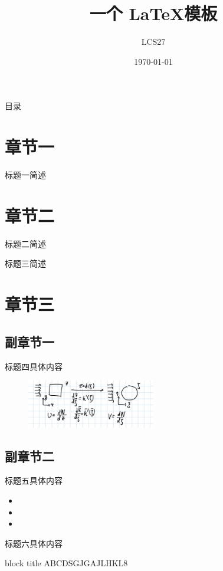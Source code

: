 \documentclass[aspectratio=169]{beamer}
\title{一个 \LaTeX 模板}
\author{LCS27}
\institute{My dear institute}
\date{\today}
\begin{document}
\maketitle
\begin{frame}{目录}
\tableofcontents
\end{frame}
\section{章节一}
\begin{frame}{标题一}{简述}
\zhlipsum[10]
\end{frame}

\section{章节二}
\begin{frame}[allowframebreaks]{标题二}{简述}
\zhlipsum[11]
\end{frame}
\begin{frame}[allowframebreaks]{标题三}{简述}
\zhlipsum[12]
\end{frame}

\section{章节三}
\subsection{副章节一}
\begin{frame}[allowframebreaks]{标题四}{具体内容}
\zhlipsum[1]
\begin{figure}
    \centering
    \includegraphics[width=0.5\textwidth]{../picture/1.jpg}
\end{figure}
\end{frame}
\subsection{副章节二}
\begin{frame}[allowframebreaks]{标题五}{具体内容}
\zhlipsum[2]
\begin{itemize}
    \item \zhlipsum[3]
    \item \zhlipsum[4]
    \item \zhlipsum[5]
\end{itemize}
\end{frame}

\begin{frame}{标题六}{具体内容}
\begin{block}{block title}
ABCDSGJGAJLHKL8
\end{block}
\end{frame}
\end{document}

